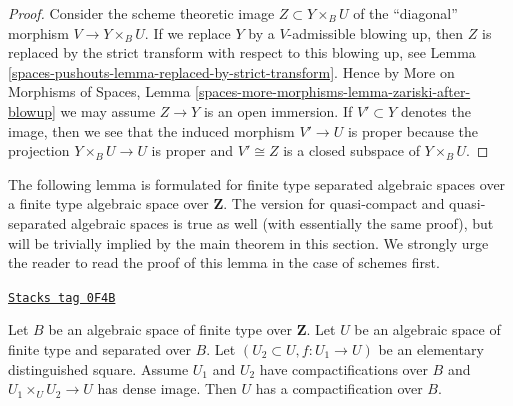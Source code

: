 \begin{proof}
Consider the scheme theoretic image $Z \subset Y \times_B U$
of the ``diagonal'' morphism $V \to Y \times_B U$. If we replace
$Y$ by a $V$-admissible blowing up, then $Z$ is replaced by
the strict transform with respect to this blowing up, see
Lemma \ref{spaces-pushouts-lemma-replaced-by-strict-transform}. Hence by
More on Morphisms of Spaces, Lemma
\ref{spaces-more-morphisms-lemma-zariski-after-blowup}
we may assume $Z \to Y$
is an open immersion. If $V' \subset Y$ denotes the image, then we
see that the induced morphism $V' \to U$ is proper because the
projection $Y \times_B U \to U$ is proper and $V' \cong Z$
is a closed subspace of $Y \times_B U$.
\end{proof}

The following lemma is formulated for finite type separated algebraic spaces
over a finite type algebraic space over $\mathbf{Z}$. The version for
quasi-compact and quasi-separated algebraic spaces is true as well (with
essentially the same proof), but will be trivially
implied by the main theorem in this section. We strongly urge the
reader to read the proof of this lemma in the case of schemes first.

\begin{lemma}
\label{spaces-pushouts-lemma-two-compactifications}
\href{https://stacks.math.columbia.edu/tag/0F4B}{\texttt{Stacks tag 0F4B}}

Let $B$ be an algebraic space of finite type over $\mathbf{Z}$.
Let $U$ be an algebraic space of finite type and separated over $B$.
Let $(U_2 \subset U, f : U_1 \to U)$ be an
elementary distinguished square. Assume $U_1$ and $U_2$ have
compactifications over $B$ and $U_1 \times_U U_2 \to U$ has dense image.
Then $U$ has a compactification over $B$.
\end{lemma}

